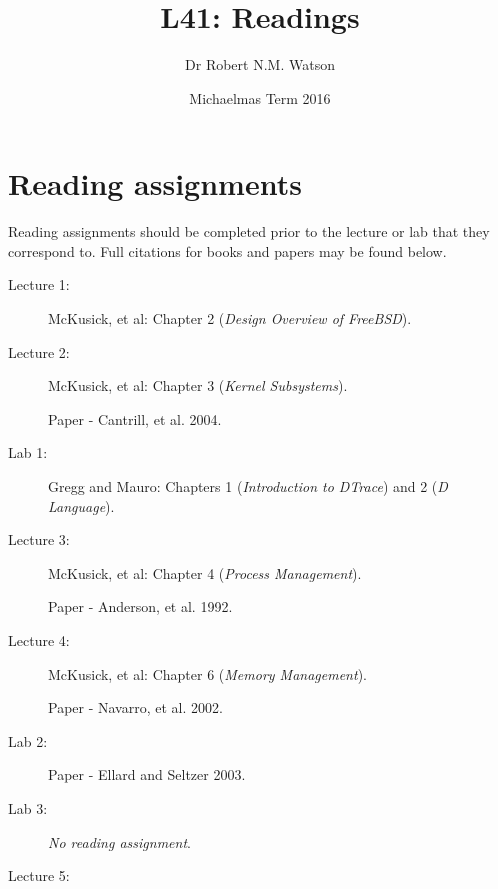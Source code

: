 \documentclass[a4paper,10pt]{article}
\begin{document}
\title{L41: Readings}
\author{Dr Robert N.M. Watson}
\date{Michaelmas Term 2016}
\maketitle

\section*{Reading assignments}
Reading assignments should be completed prior to the lecture or lab that they
correspond to.
Full citations for books and papers may be found below.

\begin{description}
\item[Lecture 1:]

  McKusick, et al: Chapter 2 (\textit{Design Overview of FreeBSD}).

\item[Lecture 2:]

  McKusick, et al: Chapter 3 (\textit{Kernel Subsystems}).

  Paper - Cantrill, et al. 2004.

\item[Lab 1:]

  Gregg and Mauro: Chapters 1 (\textit{Introduction to DTrace}) and
  2 (\textit{D Language}).

\item[Lecture 3:]

  McKusick, et al: Chapter 4 (\textit{Process Management}).

  Paper - Anderson, et al. 1992.

\item[Lecture 4:]

  McKusick, et al: Chapter 6 (\textit{Memory Management}).

  Paper - Navarro, et al. 2002.

\item[Lab 2:]

  Paper - Ellard and Seltzer 2003.

\item[Lab 3:]


  \textit{No reading assignment}.

\item[Lecture 5:]


\end{description}
\end{document}
